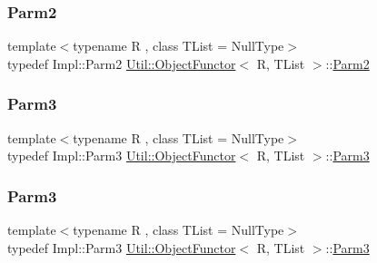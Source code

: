\mbox{\label{classUtil_1_1ObjectFunctor_a6809cf65883dc7575e01d9b9849649cf}} 
\subsubsection{\texorpdfstring{Parm2}{Parm2}\hspace{0.1cm}{\footnotesize\ttfamily [2/2]}}
{\footnotesize\ttfamily template$<$typename R , class T\+List  = Null\+Type$>$ \\
typedef Impl\+::\+Parm2 \mbox{\hyperlink{classUtil_1_1ObjectFunctor}{Util\+::\+Object\+Functor}}$<$ R, T\+List $>$\+::\mbox{\hyperlink{classUtil_1_1ObjectFunctor_a6809cf65883dc7575e01d9b9849649cf}{Parm2}}}

\mbox{\label{classUtil_1_1ObjectFunctor_a6becd26610c6091b9ba93cd96f3def66}} 
\subsubsection{\texorpdfstring{Parm3}{Parm3}\hspace{0.1cm}{\footnotesize\ttfamily [1/2]}}
{\footnotesize\ttfamily template$<$typename R , class T\+List  = Null\+Type$>$ \\
typedef Impl\+::\+Parm3 \mbox{\hyperlink{classUtil_1_1ObjectFunctor}{Util\+::\+Object\+Functor}}$<$ R, T\+List $>$\+::\mbox{\hyperlink{classUtil_1_1ObjectFunctor_a6becd26610c6091b9ba93cd96f3def66}{Parm3}}}

\mbox{\label{classUtil_1_1ObjectFunctor_a6becd26610c6091b9ba93cd96f3def66}} 
\subsubsection{\texorpdfstring{Parm3}{Parm3}\hspace{0.1cm}{\footnotesize\ttfamily [2/2]}}
{\footnotesize\ttfamily template$<$typename R , class T\+List  = Null\+Type$>$ \\
typedef Impl\+::\+Parm3 \mbox{\hyperlink{classUtil_1_1ObjectFunctor}{Util\+::\+Object\+Functor}}$<$ R, T\+List $>$\+::\mbox{\hyperlink{classUtil_1_1ObjectFunctor_a6becd26610c6091b9ba93cd96f3def66}{Parm3}}}

